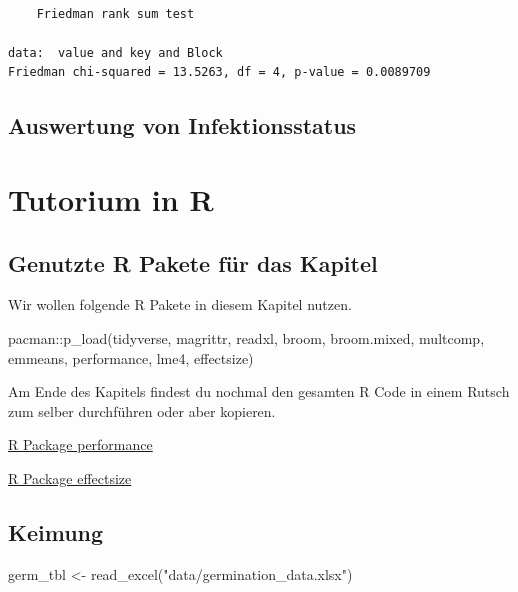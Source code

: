 \documentclass[
  letterpaper,
  DIV=11,
  oneside]{scrreport}
\newenvironment{Shaded}{\begin{snugshade}}{\end{snugshade}}
\newcommand{\FunctionTok}[1]{\textcolor[rgb]{0.28,0.35,0.67}{#1}}
\newcommand{\NormalTok}[1]{\textcolor[rgb]{0.00,0.23,0.31}{#1}}
\newcommand{\OtherTok}[1]{\textcolor[rgb]{0.00,0.23,0.31}{#1}}
\newcommand{\SpecialCharTok}[1]{\textcolor[rgb]{0.37,0.37,0.37}{#1}}
\newcommand{\StringTok}[1]{\textcolor[rgb]{0.13,0.47,0.30}{#1}}
\begin{document}
\begin{verbatim}

    Friedman rank sum test

data:  value and key and Block
Friedman chi-squared = 13.5263, df = 4, p-value = 0.0089709
\end{verbatim}

\hypertarget{auswertung-von-infektionsstatus}{%
\section{Auswertung von
Infektionsstatus}\label{auswertung-von-infektionsstatus}}

\hypertarget{tutorium-in-r}{%
\chapter{Tutorium in R}\label{tutorium-in-r}}

\hypertarget{genutzte-r-pakete-fuxfcr-das-kapitel-13}{%
\section{Genutzte R Pakete für das
Kapitel}\label{genutzte-r-pakete-fuxfcr-das-kapitel-13}}

Wir wollen folgende R Pakete in diesem Kapitel nutzen.

\begin{Shaded}
\begin{Highlighting}[]
\NormalTok{pacman}\SpecialCharTok{::}\FunctionTok{p\_load}\NormalTok{(tidyverse, magrittr, readxl, broom, broom.mixed, }
\NormalTok{               multcomp, emmeans, performance, lme4, effectsize)}
\end{Highlighting}
\end{Shaded}

Am Ende des Kapitels findest du nochmal den gesamten R Code in einem
Rutsch zum selber durchführen oder aber kopieren.

\href{https://easystats.github.io/effectsize/articles/effectsize.html}{R
Package performance}

\href{https://easystats.github.io/performance/index.html}{R Package
effectsize}

\hypertarget{keimung}{%
\section{Keimung}\label{keimung}}

\begin{Shaded}
\begin{Highlighting}[]
\NormalTok{germ\_tbl }\OtherTok{\textless{}{-}} \FunctionTok{read\_excel}\NormalTok{(}\StringTok{"data/germination\_data.xlsx"}\NormalTok{)}
\end{Highlighting}
\end{Shaded}
\end{document}
